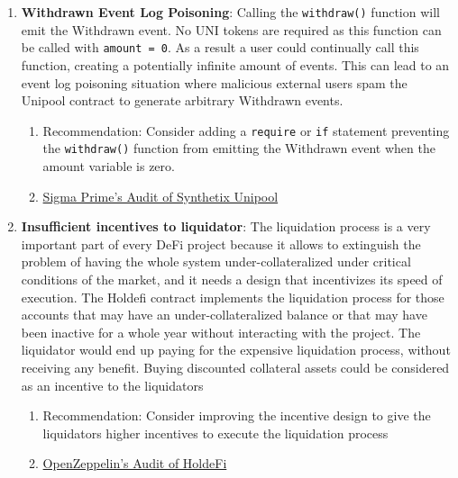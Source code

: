\begin{enumerate}
\item\textbf{Withdrawn Event Log Poisoning}: Calling the \verb|withdraw()| function will emit the Withdrawn event. No UNI tokens are required as this function can be called with \verb|amount = 0|. As a result a user could continually call this function, creating a potentially infinite amount of events. This can lead to an event log poisoning situation where malicious external users spam the Unipool contract to generate arbitrary Withdrawn events.
	\begin{enumerate}
	\item Recommendation: Consider adding a \verb|require| or \verb|if| statement preventing the \verb|withdraw()| function from emitting the Withdrawn event when the amount variable is zero.
	\item\href{https://github.com/sigp/public-audits/blob/master/synthetix/unipool/review.pdf}{Sigma Prime's Audit of Synthetix Unipool}
	\end{enumerate}

\item\textbf{Insufficient incentives to liquidator}: The liquidation process is a very important part of every DeFi project because it allows to extinguish the problem of having the whole system under-collateralized under critical conditions of the market, and it needs a design that incentivizes its speed of execution. The Holdefi contract implements the liquidation process for those accounts that may have an under-collateralized balance or that may have been inactive for a whole year without interacting with the project. The liquidator would end up paying for the expensive liquidation process, without receiving any benefit. Buying discounted collateral assets could be considered as an incentive to the liquidators
	\begin{enumerate}
	\item Recommendation: Consider improving the incentive design to give the liquidators higher incentives to execute the liquidation process
	\item\href{https://blog.openzeppelin.com/holdefi-audit}{OpenZeppelin's Audit of HoldeFi}
	\end{enumerate}


\end{enumerate}
